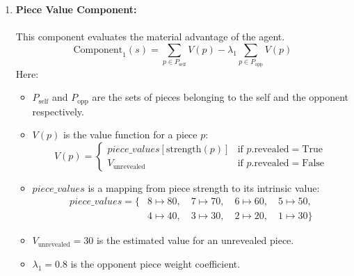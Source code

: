 \documentclass{article}
\begin{document}
\begin{enumerate}
    \item   \textbf{Piece Value Component:}
            \\
            \\
            This component evaluates the material advantage of the agent.
            \begin{equation}
                \label{eq:piece_value}
                \text{Component}_1(s) = \sum_{p \in P_{\text{self}}} V(p) - \lambda_1 \sum_{p \in P_{\text{opp}}} V(p)
            \end{equation}
            Here:
            \begin{itemize}
                \item $P_{\text{self}}$ and $P_{\text{opp}}$ are the sets of pieces belonging to the self and the opponent respectively.
                \item $V(p)$ is the value function for a piece $p$:
                \begin{equation}
                \label{eq:piece_value_function}
                V(p) = \begin{cases}
                \textit{piece\_values}[\text{strength}(p)] & \text{if } p.\text{revealed} = \text{True} \\
                V_{\text{unrevealed}} & \text{if } p.\text{revealed} = \text{False}
                \end{cases}
                \end{equation}
                \item $\textit{piece\_values}$ is a mapping from piece strength to its intrinsic value:
                \begin{align*}
                    \textit{piece\_values} = \{& 8 \mapsto 80, \quad 7 \mapsto 70, \quad 6 \mapsto 60, \quad 5 \mapsto 50, \\
                    & 4 \mapsto 40, \quad 3 \mapsto 30, \quad 2 \mapsto 20, \quad 1 \mapsto 30 \}
                \end{align*}
                \item $V_{\text{unrevealed}} = 30$ is the estimated value for an unrevealed piece.
                \item $\lambda_1 = 0.8$ is the opponent piece weight coefficient.
            \end{itemize}
            


\end{enumerate}
\end{document}
